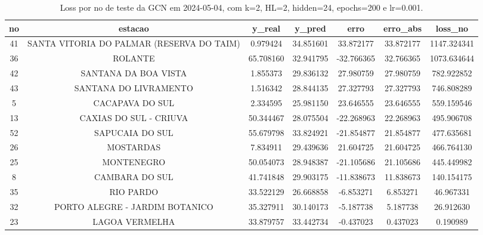 \begin{table}[h]
\centering
\caption{Loss por no de teste da GCN em 2024-05-04, com k=2, HL=2, hidden=24, epochs=200 e lr=0.001.}
\label{tab:gcn_loss_k2_hl2_h24_e200_d20240504}
\begin{tabular}{ccccccc}
\toprule
no & estacao & y\_real & y\_pred & erro & erro\_abs & loss\_no \\
\midrule
41 & SANTA VITORIA DO PALMAR (RESERVA DO TAIM) & 0.979424 & 34.851601 & 33.872177 & 33.872177 & 1147.324341 \\
36 & ROLANTE & 65.708160 & 32.941795 & -32.766365 & 32.766365 & 1073.634644 \\
42 & SANTANA DA BOA VISTA & 1.855373 & 29.836132 & 27.980759 & 27.980759 & 782.922852 \\
43 & SANTANA DO LIVRAMENTO & 1.516342 & 28.844135 & 27.327793 & 27.327793 & 746.808289 \\
5 & CACAPAVA DO SUL & 2.334595 & 25.981150 & 23.646555 & 23.646555 & 559.159546 \\
13 & CAXIAS DO SUL - CRIUVA & 50.344467 & 28.075504 & -22.268963 & 22.268963 & 495.906708 \\
52 & SAPUCAIA DO SUL & 55.679798 & 33.824921 & -21.854877 & 21.854877 & 477.635681 \\
26 & MOSTARDAS & 7.834911 & 29.439636 & 21.604725 & 21.604725 & 466.764130 \\
25 & MONTENEGRO & 50.054073 & 28.948387 & -21.105686 & 21.105686 & 445.449982 \\
8 & CAMBARA DO SUL & 41.741848 & 29.903175 & -11.838673 & 11.838673 & 140.154175 \\
35 & RIO PARDO & 33.522129 & 26.668858 & -6.853271 & 6.853271 & 46.967331 \\
32 & PORTO ALEGRE - JARDIM BOTANICO & 35.327911 & 30.140173 & -5.187738 & 5.187738 & 26.912630 \\
23 & LAGOA VERMELHA & 33.879757 & 33.442734 & -0.437023 & 0.437023 & 0.190989 \\
\bottomrule
\end{tabular}
\end{table}
